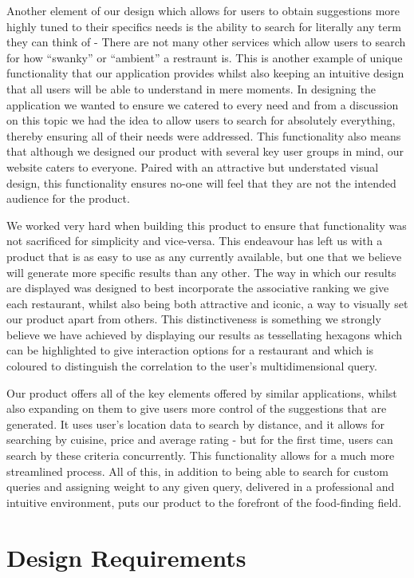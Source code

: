 \documentclass[10pt,a4paper]{article}
\begin{document}
Another element of our design which allows for users to obtain suggestions more highly tuned to their specifics needs is the ability to search for literally any term they can think of - There are not many other services which allow users to search for how “swanky” or “ambient” a restraunt is. This is another example of unique functionality that our application provides whilst also keeping an intuitive design that all users will be able to understand in mere moments. In designing the application we wanted to ensure we catered to every need and from a discussion on this topic we had the idea to allow users to search for absolutely everything, thereby ensuring all of their needs were addressed. This functionality also means that although we designed our product with several key user groups in mind, our website caters to everyone. Paired with an attractive but understated visual design, this functionality ensures no-one will feel that they are not the intended audience for the product.

We worked very hard when building this product to ensure that functionality was not sacrificed for simplicity and vice-versa. This endeavour has left us with a product that is as easy to use as any currently available, but one that we believe will generate more specific results than any other. The way in which our results are displayed was designed to best incorporate the associative ranking we give each restaurant, whilst also being both attractive and iconic, a way to visually set our product apart from others. This distinctiveness is something we strongly believe we have achieved by displaying our results as tessellating hexagons which can be highlighted to give interaction options for a restaurant and which is coloured to distinguish the correlation to the user’s multidimensional query.

Our product offers all of the key elements offered by similar applications, whilst also expanding on them to give users more control of the suggestions that are generated. It uses user’s location data to search by distance, and it allows for searching by cuisine, price and average rating - but for the first time, users can search by these criteria concurrently. This functionality allows for a much more streamlined process. All of this, in addition to being able to search for custom queries and assigning weight to any given query, delivered in a professional and intuitive environment, puts our product to the forefront of the food-finding field. 

\section*{Design Requirements}
\end{document}
